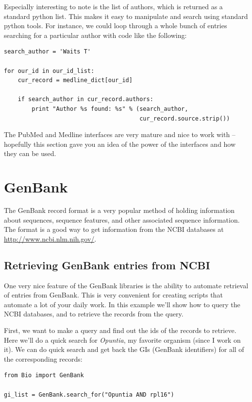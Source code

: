 \documentclass{report}
\begin{document}
Especially interesting to note is the list of authors, which is returned as a standard python list. This makes it easy to manipulate and search using standard python tools. For instance, we could loop through a whole bunch of entries searching for a particular author with code like the following:

\begin{verbatim}
search_author = 'Waits T'

for our_id in our_id_list:
    cur_record = medline_dict[our_id]
    
    if search_author in cur_record.authors:
        print "Author %s found: %s" % (search_author,
                                       cur_record.source.strip())
\end{verbatim} 

The PubMed and Medline interfaces are very mature and nice to work with -- hopefully this section gave you an idea of the power of the interfaces and how they can be used.

\section{GenBank}

The GenBank record format is a very popular method of holding information about sequences, sequence features, and other associated sequence information. The format is a good way to get information from the NCBI databases at \url{http://www.ncbi.nlm.nih.gov/}. 

\subsection{Retrieving GenBank entries from NCBI}
\label{genbank-retrieval}

One very nice feature of the GenBank libraries is the ability to automate retrieval of entries from GenBank. This is very convenient for creating scripts that automate a lot of your daily work. In this example we'll show how to query the NCBI databases, and to retrieve the records from the query.

First, we want to make a query and find out the ids of the records to retrieve. Here we'll do a quick search for \emph{Opuntia}, my favorite organism (since I work on it). We can do quick search and get back the GIs (GenBank identifiers) for all of the corresponding records:

\begin{verbatim}
from Bio import GenBank

gi_list = GenBank.search_for("Opuntia AND rpl16")
\end{verbatim}
\end{document}
